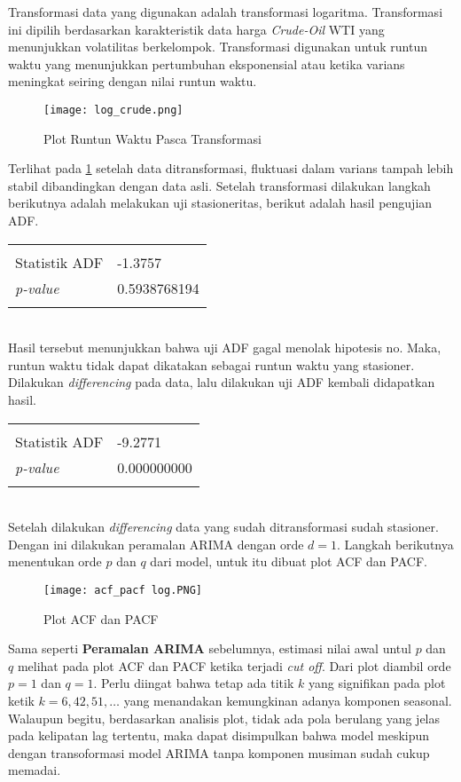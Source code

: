 \documentclass[a4paper,12pt]{article}
\begin{document}
Transformasi data yang digunakan adalah transformasi logaritma. Transformasi ini dipilih berdasarkan karakteristik data harga \textit{Crude-Oil} WTI yang menunjukkan volatilitas berkelompok. Transformasi digunakan untuk runtun waktu yang menunjukkan pertumbuhan eksponensial atau ketika varians meningkat seiring dengan nilai runtun waktu.

\begin{figure}[htb!]
    \centering
    \texttt{[image: log\_crude.png]}
    \caption{Plot Runtun Waktu Pasca Transformasi}
    \label{fig:log-oil}
\end{figure}
Terlihat pada \ref{fig:log-oil} setelah data ditransformasi, fluktuasi dalam varians tampah lebih stabil dibandingkan dengan data asli. Setelah transformasi dilakukan langkah berikutnya adalah melakukan uji stasioneritas, berikut adalah hasil pengujian ADF.

\begin{tabular}{l l}
    &\\
    Statistik ADF & -1.3757 \\
    \textit{p-value} & 0.5938768194\\
    &
\end{tabular}\\
Hasil tersebut menunjukkan bahwa uji ADF gagal menolak hipotesis no. Maka, runtun waktu tidak dapat dikatakan sebagai runtun waktu yang stasioner. Dilakukan \textit{differencing} pada data, lalu dilakukan uji ADF kembali didapatkan hasil.

\begin{tabular}{l l}
    &\\
    Statistik ADF & -9.2771 \\
    \textit{p-value} & 0.000000000\\
    &
\end{tabular}\\
Setelah dilakukan \textit{differencing} data yang sudah ditransformasi sudah stasioner. Dengan ini dilakukan peramalan ARIMA dengan orde $d = 1$. Langkah berikutnya menentukan orde $p$ dan $q$ dari model, untuk itu dibuat plot ACF dan PACF.

\begin{figure}[htb!]
    \centering
    \texttt{[image: acf\_pacf log.PNG]}
    \caption{Plot ACF dan PACF}
    \label{fig:acf pacf log}
\end{figure}
Sama seperti \textbf{Peramalan ARIMA} sebelumnya, estimasi nilai awal untul $p$ dan $q$ melihat pada plot ACF dan PACF ketika terjadi \textit{cut off}. Dari plot diambil orde $p = 1$ dan $q = 1$. Perlu diingat bahwa tetap ada titik $k$ yang signifikan pada plot ketik $k = 6, 42, 51, \ldots$ yang menandakan kemungkinan adanya komponen seasonal. Walaupun begitu, berdasarkan analisis plot, tidak ada pola berulang yang jelas pada kelipatan lag tertentu, maka dapat disimpulkan bahwa model meskipun dengan transoformasi model ARIMA tanpa komponen musiman sudah cukup memadai.
\end{document}
